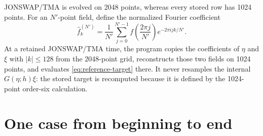 \documentclass[10pt]{article}
\begin{document}
JONSWAP/TMA is evolved on 2048 points, whereas every stored row has 1024
points.  For an $N'$-point field, define the normalized Fourier coefficient
\begin{equation}
  \widehat f_k^{(N')}
  =\frac1{N'}\sum_{j=0}^{N'-1}
    f\!\left(\frac{2\pi j}{N'}\right)e^{-2\pi i jk/N'}.
  \label{eq:normalized-grid-transfer}
\end{equation}
At a retained JONSWAP/TMA time, the program copies the coefficients of
\(\eta\) and \(\xi\) with \(|k|\le128\) from the 2048-point grid, reconstructs
those two fields on 1024 points, and evaluates
\eqref{eq:reference-target} there.  It never resamples the internal
\(G(\eta;h)\xi\): the stored target is recomputed because it is defined by the
1024-point order-six calculation.

\section{One case from beginning to end}
\label{sec:pipeline}
\end{document}
